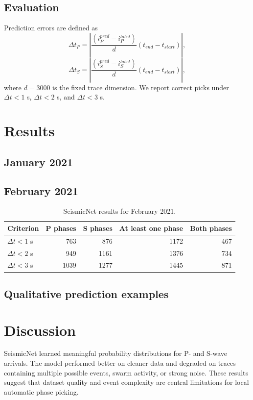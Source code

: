 \documentclass[11pt]{article}
\begin{document}
\subsection{Evaluation}
Prediction errors are defined as
\begin{equation}
\Delta t_P = \left| \frac{(i_P^{pred} - i_P^{label})}{d}(t_{end}-t_{start}) \right|,
\end{equation}
\begin{equation}
\Delta t_S = \left| \frac{(i_S^{pred} - i_S^{label})}{d}(t_{end}-t_{start}) \right|,
\end{equation}
where $d=3000$ is the fixed trace dimension. We report correct picks under $\Delta t<1$ s, $\Delta t<2$ s, and $\Delta t<3$ s.

\section{Results}
\subsection{January 2021}

\subsection{February 2021}
\begin{table}[h]
\centering
\caption{SeismicNet results for February 2021.}
\begin{tabular}{lrrrr}
\toprule
Criterion & P phases & S phases & At least one phase & Both phases \\
\midrule
$\Delta t < 1$ s & 763 & 876 & 1172 & 467 \\
$\Delta t < 2$ s & 949 & 1161 & 1376 & 734 \\
$\Delta t < 3$ s & 1039 & 1277 & 1445 & 871 \\
\bottomrule
\end{tabular}
\end{table}

\subsection{Qualitative prediction examples}

\section{Discussion}
SeismicNet learned meaningful probability distributions for P- and S-wave arrivals. The model performed better on cleaner data and degraded on traces containing multiple possible events, swarm activity, or strong noise. These results suggest that dataset quality and event complexity are central limitations for local automatic phase picking.
\end{document}
